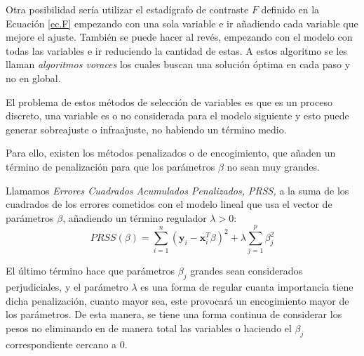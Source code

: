 \noindent Otra posibilidad sería utilizar el estadígrafo de contraste $F$ definido en la Ecuación \eqref{ec.F} empezando con una sola variable e ir añadiendo cada variable que mejore el ajuste. También se puede hacer al revés, empezando con el modelo con todas las variables e ir reduciendo la cantidad de estas. A estos algoritmo se les llaman \emph{algoritmos voraces} los cuales buscan una solución óptima en cada paso y no en global. 

\noindent El problema de estos métodos de selección de variables es que es un proceso discreto, una variable es o no considerada para el modelo siguiente y esto puede generar sobreajuste o infraajuste, no habiendo un término medio. 

\noindent Para ello, existen los métodos penalizados o de encogimiento, que añaden un término de penalización para que los parámetros $\beta$ no sean muy grandes.

\begin{defi} 
Llamamos \emph{Errores Cuadrados Acumulados Penalizados, PRSS,} a la suma de los cuadrados de los errores cometidos con el modelo lineal que usa el  vector de parámetros $\beta$, añadiendo un término regulador $\lambda >0$: 
\begin{equation}
PRSS(\beta)=\sum_{i=1}^n(\textbf{y}_i-\textbf{x}_i^T\beta)^2+\lambda\sum_{j=1}^p\beta_j^2
\end{equation}
\end{defi}
\noindent El último término hace que parámetros $\beta_j$ grandes sean considerados perjudiciales, y el parámetro $\lambda$ es una forma de regular cuanta importancia tiene dicha penalización, cuanto mayor sea, este provocará un encogimiento mayor de los parámetros. 
De esta manera, se tiene una forma continua de considerar los pesos no eliminando en de manera total las variables o haciendo el $\beta_j$ correspondiente cercano a 0. 















